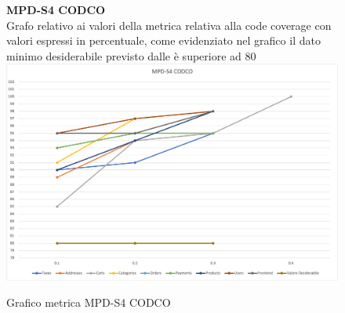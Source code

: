 \begin{center}
\begin{center}
    \end{center}




    \begin{figure}[!htb]
        \centering
        \textbf{MPD-S4 CODCO} \\
        Grafo relativo ai valori della metrica relativa alla code coverage con valori espressi in percentuale, come evidenziato nel 
        grafico il dato minimo desiderabile previsto dalle  è superiore ad 80
        \includegraphics[scale=0.60]{res/images/ra/ra_codco.png}
        \caption{Grafico metrica MPD-S4 CODCO}
    \end{figure}
    \begin{center}
        
    \end{center}


\end{center}

\newpage



